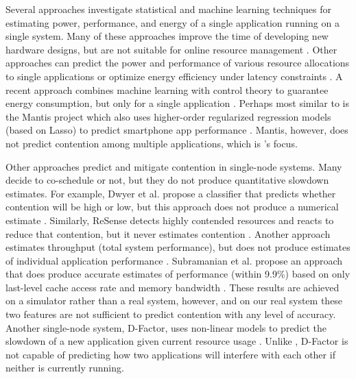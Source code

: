 Several approaches investigate statistical and machine learning
techniques for estimating power, performance, and energy of a single
application running on a single system.  Many of these approaches
improve the time of developing new hardware designs, but are not
suitable for online resource management
\cite{Yi2003,LeeBrooks2006,CPR}.  Other approaches can predict the
power and performance of various resource allocations to single
applications \cite{Koala} or optimize energy efficiency under latency
constraints \cite{LEO}.  A recent approach combines machine learning
with control theory to guarantee energy consumption, but only for a
single application \cite{JouleGuard}.  Perhaps most similar to
\SYSTEMESP{} is the Mantis project which also uses higher-order
regularized regression models (based on Lasso) to predict smartphone
app performance \cite{kwon2013mantis}.  Mantis, however, does not
predict contention among multiple applications, which is \SYSTEMESP{}'s
focus.

Other approaches predict and mitigate contention in single-node
systems.  Many decide to co-schedule or not, but they do not produce
quantitative slowdown estimates.  For example, Dwyer et al. propose a
classifier that predicts whether contention will be high or low, but
this approach does not produce a numerical estimate
\cite{dwyer2012practical}.  Similarly, ReSense detects highly
contended resources and reacts to reduce that contention, but it never
estimates contention \cite{resense}. Another approach estimates
throughput (total system performance), but does not produce estimates
of individual application performance
\cite{xu2010cache,chen2010performance}.  Subramanian et al. propose an
approach that does produce accurate estimates of performance (within
9.9\%) based on only last-level cache access rate and memory bandwidth
\cite{subramanian2015slowdown}.  These results are achieved on a
simulator rather than a real system, however, and on our real system
these two features are not sufficient to predict contention with any
level of accuracy.  Another single-node system, D-Factor, uses
non-linear models to predict the slowdown of a new application given
current resource usage \cite{Lim2012dfactor}.  Unlike \SYSTEMESP{},
D-Factor is not capable of predicting how two applications will
interfere with each other if neither is currently running.


